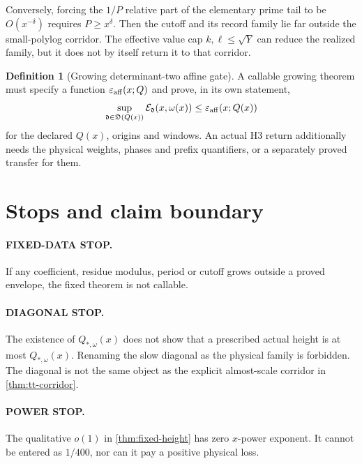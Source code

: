 \documentclass[11pt]{article}
\theoremstyle{definition}
\newtheorem{definition}[theorem]{Definition}
\theoremstyle{remark}
\begin{document}
Conversely, forcing the \(1/P\) relative part of the elementary
prime tail to be \(O(x^{-\delta})\) requires \(P\ge x^\delta\).
Then the cutoff and its record family lie far outside the
small-polylog corridor.  The effective value cap
\(k,\ell\le\sqrt Y\) can reduce the realized family, but it does
not by itself return it to that corridor.

\begin{definition}[Growing determinant-two affine gate]
\label{def:growing-gate}
A callable growing theorem must specify a function
\(\varepsilon_{\rm aff}(x;Q)\) and prove, in its own statement,
\[
 \sup_{\mathfrak d\in\mathfrak D(Q(x))}
 \mathcal E_{\mathfrak d}(x,\omega(x))
 \le\varepsilon_{\rm aff}(x;Q(x))
\]
for the declared \(Q(x)\), origins and windows.  An actual H3
return additionally needs the physical weights, phases and prefix
quantifiers, or a separately proved transfer for them.
\end{definition}

\section{Stops and claim boundary}

\paragraph{FIXED-DATA STOP.}
If any coefficient, residue modulus, period or cutoff grows outside
a proved envelope, the fixed theorem is not callable.

\paragraph{DIAGONAL STOP.}
The existence of \(Q_{*,\omega}(x)\) does not show that a prescribed actual
height is at most \(Q_{*,\omega}(x)\).  Renaming the slow diagonal
as the physical family is forbidden.  The diagonal is not the same
object as the explicit almost-scale corridor in
\cref{thm:tt-corridor}.

\paragraph{POWER STOP.}
The qualitative \(o(1)\) in \cref{thm:fixed-height} has zero
\(x\)-power exponent.  It cannot be entered as \(1/400\), nor can
it pay a positive physical loss.
\end{document}
